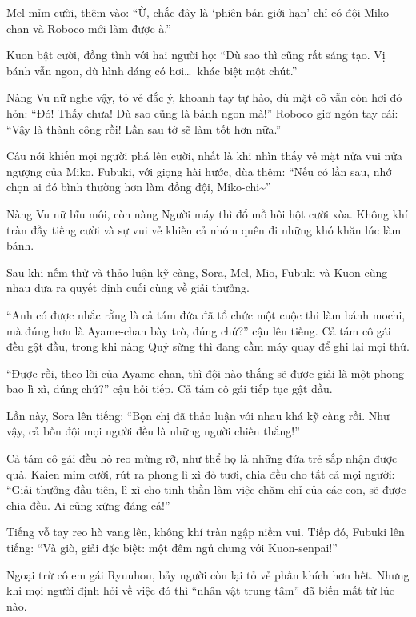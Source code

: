 \documentclass[../main.tex]{subfiles}
\begin{document}
Mel mỉm cười, thêm vào: ``Ừ, chắc đây là `phiên bản giới hạn' chỉ có đội Miko-chan và Roboco mới làm được à.''

Kuon bật cười, đồng tình với hai người họ: ``Dù sao thì cũng rất sáng tạo. Vị bánh vẫn ngon, dù hình dáng có hơi\dots\ khác biệt một chút.''

Nàng Vu nữ nghe vậy, tỏ vẻ đắc ý, khoanh tay tự hào, dù mặt cô vẫn còn hơi đỏ hỏn: ``Đó! Thấy chưa! Dù sao cũng là bánh ngon mà!'' Roboco giơ ngón tay cái: ``Vậy là thành công rồi! Lần sau tớ sẽ làm tốt hơn nữa.''

Câu nói khiến mọi người phá lên cười, nhất là khi nhìn thấy vẻ mặt nửa vui nửa ngượng của Miko. Fubuki, với giọng hài hước, đùa thêm: ``Nếu có lần sau, nhớ chọn ai đó bình thường hơn làm đồng đội, Miko-chi\~{}''

Nàng Vu nữ bĩu môi, còn nàng Người máy thì đổ mồ hôi hột cười xòa. Không khí tràn đầy tiếng cười và sự vui vẻ khiến cả nhóm quên đi những khó khăn lúc làm bánh.

\ct

Sau khi nếm thử và thảo luận kỹ càng, Sora, Mel, Mio, Fubuki và Kuon cùng nhau đưa ra quyết định cuối cùng về giải thưởng.

``Anh có được nhắc rằng là cả tám đứa đã tổ chức một cuộc thi làm bánh mochi, mà đúng hơn là Ayame-chan bày trò, đúng chứ?'' cậu lên tiếng. Cả tám cô gái đều gật đầu, trong khi nàng Quỷ sừng thì đang cầm máy quay để ghi lại mọi thứ.

``Được rồi, theo lời của Ayame-chan, thì đội nào thắng sẽ được giải là một phong bao lì xì, đúng chứ?'' cậu hỏi tiếp. Cả tám cô gái tiếp tục gật đầu.

Lần này, Sora lên tiếng: ``Bọn chị đã thảo luận với nhau khá kỹ càng rồi. Như vậy, cả bốn đội mọi người đều là những người chiến thắng!''

Cả tám cô gái đều hò reo mừng rỡ, như thể họ là những đứa trẻ sắp nhận được quà. Kaien mỉm cười, rút ra phong lì xì đỏ tươi, chia đều cho tất cả mọi người: ``Giải thưởng đầu tiên, lì xì cho tinh thần làm việc chăm chỉ của các con, sẽ được chia đều. Ai cũng xứng đáng cả!''

Tiếng vỗ tay reo hò vang lên, không khí tràn ngập niềm vui. Tiếp đó, Fubuki lên tiếng: ``Và giờ, giải đặc biệt: một đêm ngủ chung với Kuon-senpai!''

Ngoại trừ cô em gái Ryuuhou, bảy người còn lại tỏ vẻ phấn khích hơn hết. Nhưng khi mọi người định hỏi về việc đó thì ``nhân vật trung tâm'' đã biến mất từ lúc nào.
\end{document}
